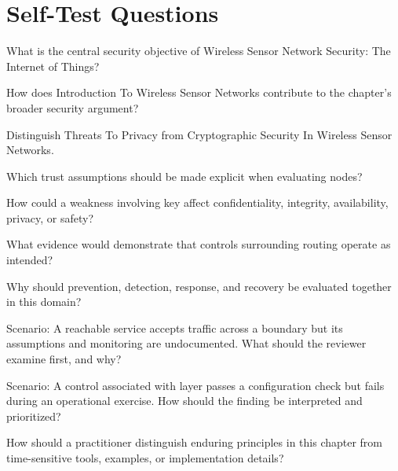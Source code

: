 \documentclass[11pt,letterpaper]{article}
\begin{document}
\section*{Self-Test Questions}
\begin{CornellRecallList}
\item What is the central security objective of Wireless Sensor Network Security: The Internet of Things?
\item How does Introduction To Wireless Sensor Networks contribute to the chapter's broader security argument?
\item Distinguish Threats To Privacy from Cryptographic Security In Wireless Sensor Networks.
\item Which trust assumptions should be made explicit when evaluating nodes?
\item How could a weakness involving key affect confidentiality, integrity, availability, privacy, or safety?
\item What evidence would demonstrate that controls surrounding routing operate as intended?
\item Why should prevention, detection, response, and recovery be evaluated together in this domain?
\item Scenario: A reachable service accepts traffic across a boundary but its assumptions and monitoring are undocumented. What should the reviewer examine first, and why?
\item Scenario: A control associated with layer passes a configuration check but fails during an operational exercise. How should the finding be interpreted and prioritized?
\item How should a practitioner distinguish enduring principles in this chapter from time-sensitive tools, examples, or implementation details?
\end{CornellRecallList}
\end{document}
